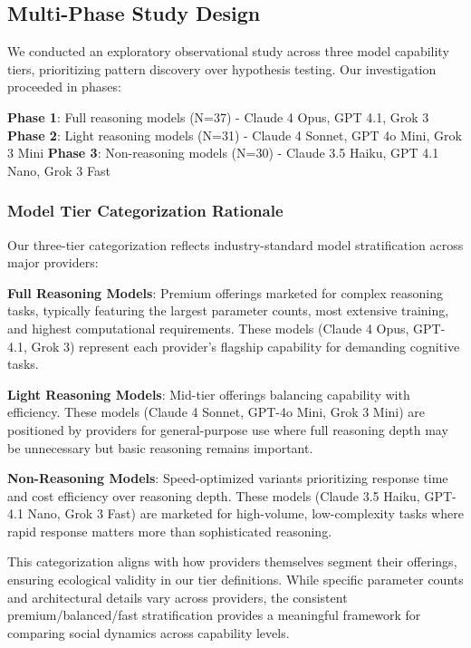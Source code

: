 \documentclass[11pt,letterpaper]{article}
\newcommand{\exponedataTotalSessionsRaw}{37}
\newcommand{\exponedataTotalSessions}{N=\exponedataTotalSessionsRaw}
\newcommand{\exptwoTotalSessionsRaw}{31}
\newcommand{\exptwoTotalSessions}{N=\exptwoTotalSessionsRaw}
\newcommand{\expthreeTotalSessionsRaw}{30}
\newcommand{\expthreeTotalSessions}{N=\expthreeTotalSessionsRaw}
\begin{document}
\subsection{Multi-Phase Study Design}

We conducted an exploratory observational study across three model capability tiers, prioritizing pattern discovery over hypothesis testing. Our investigation proceeded in phases:

\textbf{Phase 1}: Full reasoning models (\exponedataTotalSessions{}) - Claude 4 Opus, GPT 4.1, Grok 3
\textbf{Phase 2}: Light reasoning models (\exptwoTotalSessions{}) - Claude 4 Sonnet, GPT 4o Mini, Grok 3 Mini
\textbf{Phase 3}: Non-reasoning models (\expthreeTotalSessions{}) - Claude 3.5 Haiku, GPT 4.1 Nano, Grok 3 Fast

\subsubsection{Model Tier Categorization Rationale}

Our three-tier categorization reflects industry-standard model stratification across major providers:

\textbf{Full Reasoning Models}: Premium offerings marketed for complex reasoning tasks, typically featuring the largest parameter counts, most extensive training, and highest computational requirements. These models (Claude 4 Opus, GPT-4.1, Grok 3) represent each provider's flagship capability for demanding cognitive tasks.

\textbf{Light Reasoning Models}: Mid-tier offerings balancing capability with efficiency. These models (Claude 4 Sonnet, GPT-4o Mini, Grok 3 Mini) are positioned by providers for general-purpose use where full reasoning depth may be unnecessary but basic reasoning remains important.

\textbf{Non-Reasoning Models}: Speed-optimized variants prioritizing response time and cost efficiency over reasoning depth. These models (Claude 3.5 Haiku, GPT-4.1 Nano, Grok 3 Fast) are marketed for high-volume, low-complexity tasks where rapid response matters more than sophisticated reasoning.

This categorization aligns with how providers themselves segment their offerings, ensuring ecological validity in our tier definitions. While specific parameter counts and architectural details vary across providers, the consistent premium/balanced/fast stratification provides a meaningful framework for comparing social dynamics across capability levels.
\end{document}
